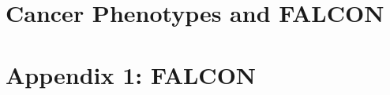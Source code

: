 \documentclass[phd,tocprelim,draft]{cornell}
\newcommand*{\commonDir}{../common/}   %
\begin{document}
\chapter{Cancer Phenotypes and FALCON}

\appendix

\chapter{Appendix 1: FALCON}




\end{document}
